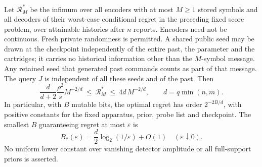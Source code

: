 \begin{theorem}\label{thm:memory-rate}
Let $\mathcal R_M^*$ be the infimum over all encoders with at most $M\ge1$
stored symbols and all decoders of their worst-case conditional regret in
the preceding fixed score problem, over attainable histories after $n$
reports. Encoders need not be continuous. Fresh private randomness is permitted. A shared public seed may be drawn
at the checkpoint independently of the entire past, the parameter and the
cartridges; it carries no historical information other than the $M$-symbol
message. Any retained seed that generated past commands counts as part of
that message. The query $J$ is independent of all these seeds and of the past. Then
\begin{equation}\label{eq:sharp-memory-rate}
 \frac{d}{d+2}\frac{\rho^2}{s}M^{-2/d}
 \ \le\ \mathcal R_M^*
 \ \le\ 4d\,M^{-2/d},\qquad d=q\min(n,m).
\end{equation}
In particular, with $B$ mutable bits, the optimal regret has order
$2^{-2B/d}$, with positive constants for the fixed apparatus, prior,
probe list and checkpoint. The smallest $B$ guaranteeing regret at most
$\varepsilon$ is
\begin{equation}\label{eq:bits-law}
 B_*(\varepsilon)=\frac d2\log_2(1/\varepsilon)+O(1)
 \quad (\varepsilon\downarrow0).
\end{equation}
No uniform lower constant over vanishing detector amplitude or all
full-support priors is asserted.
\end{theorem}

